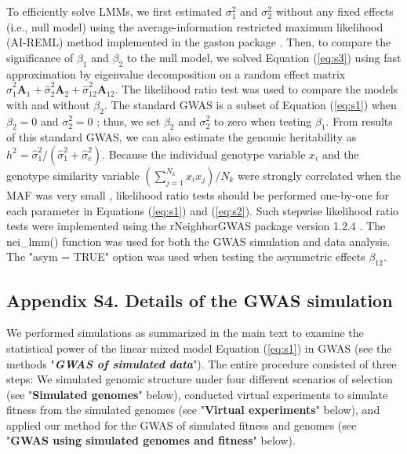 \documentclass[12pt,]{article}
\begin{document}
To efficiently solve LMMs, we first estimated $\sigma^2_1$ and $\sigma^2_2$ without any fixed effects (i.e., null model) using the average-information restricted maximum likelihood (AI-REML) method implemented in the gaston package \citep{R_gaston}. Then, to compare the significance of $\beta_1$ and $\beta_2$ to the null model, we solved Equation (\ref{eq:s3}) using fast approximation by eigenvalue decomposition on a random effect matrix $\hat{\sigma}^2_1\mathbf{A}_1+\hat{\sigma}^2_2\mathbf{A}_2+\hat{\sigma}^2_{12}\mathbf{A}_{12}$. The likelihood ratio test was used to compare the models with and without $\beta_2$. The standard GWAS is a subset of Equation (\ref{eq:s1}) when $\beta_2=0$ and $\sigma^2_2=0$ \citep{sato2019neighbor}; thus, we set $\beta_2$ and $\sigma^2_2$ to zero when testing $\beta_1$. From results of this standard GWAS, we can also estimate the genomic heritability as $h^2=\hat{\sigma}^2_1/(\hat{\sigma}^2_1 + \hat{\sigma}^2_e)$. Because the individual genotype variable $x_i$ and the genotype similarity variable $(\sum^{N_{k}}_{j=1}{x_ix_j})/N_k$ were strongly correlated when the MAF was very small \citep{sato2019neighbor}, likelihood ratio tests should be performed one-by-one for each parameter in Equations (\ref{eq:s1}) and (\ref{eq:s2}). Such stepwise likelihood ratio tests were implemented using the rNeighborGWAS package version 1.2.4 \citep{sato2019neighbor}. The nei\_lmm() function was used for both the GWAS simulation and data analysis. The "asym = TRUE" option was used when testing the asymmetric effects $\beta_{12}$.


\newpage
\clearpage
\medskip
\subsection*{Appendix S4. Details of the GWAS simulation}
We performed simulations as summarized in the main text to examine the statistical power of the linear mixed model Equation (\ref{eq:s1}) in GWAS (see the methods "\textit{\textbf{GWAS of simulated data}}"). The entire procedure consisted of three steps: We simulated genomic structure under four different scenarios of selection (see "\textbf{Simulated genomes}" below), conducted virtual experiments to simulate fitness from the simulated genomes (see "\textbf{Virtual experiments}" below), and applied our method for the GWAS of simulated fitness and genomes (see "\textbf{GWAS using simulated genomes and fitness}" below). 
\end{document}
